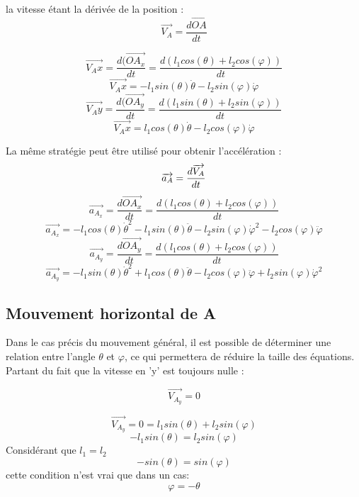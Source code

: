 \documentclass{udes_rapport} %
\begin{document}
la vitesse étant la dérivée de la position :
\begin{equation}
	\overrightarrow{V_A} = \frac{d\overrightarrow{OA}}{dt}
\end{equation}

\[ \overrightarrow{V_Ax} = \frac{d(\overrightarrow{OA_x}}{dt} = \frac{d(l_1 cos(\theta) + l_2 cos(\varphi))}{dt}	\]
\[ \overrightarrow{V_Ax} = -l_1 sin(\theta) \dot{\theta} -l_2 sin(\varphi) \dot{\varphi}								\]
\[ \overrightarrow{V_Ay} = \frac{d(\overrightarrow{OA_y}}{dt} = \frac{d(l_1 sin(\theta) + l_2 sin(\varphi))}{dt}	\]
\[ \overrightarrow{V_Ax} = l_1 cos(\theta) \dot{\theta} -l_2 cos(\varphi) \dot{\varphi}								\]


La même stratégie peut être utilisé pour obtenir l'accélération :
\begin{equation}
\overrightarrow{a_A} = \frac{d\overrightarrow{V_A}}{dt}	\\
\end{equation}
\[	\overrightarrow{a_{A_x}} = \frac{d\overrightarrow{OA_x}}{dt} = \frac{ d(l_1 cos(\theta) + l_2 cos(\varphi))}{dt}		\]
\[	\overrightarrow{a_{A_x}} = - l_1 cos(\theta)\dot{\theta}^2 - l_1 sin(\theta)\ddot{\theta} - l_2 sin(\varphi)\dot{\varphi}^2 - l_2 cos(\varphi)\ddot{\varphi}  \]
\[	\overrightarrow{a_{A_y}} = \frac{d\overrightarrow{OA_y}}{dt} = \frac{d(l_1 cos(\theta) + l_2 cos(\varphi))}{dt}		\]
\[	\overrightarrow{a_{A_y}} =  - l_1 sin(\theta)\dot{\theta}^2 + l_1 cos(\theta)\ddot{\theta} -l_2 cos(\varphi)\ddot{\varphi} + l_2 sin(\varphi)\dot{\varphi}^2 \]

\subsection{Mouvement horizontal de A}
Dans le cas précis du mouvement général, il est possible de déterminer une relation entre l'angle $\theta$ et $\varphi$, ce qui permettera de réduire la taille des équations. Partant du fait que la vitesse en 'y' est toujours nulle : 

\begin{equation}
\overrightarrow{V_{A_y}} = 0
\end{equation}

\[	\overrightarrow{V_{A_y}} = 0 = l_1 sin(\theta) + l_2 sin(\varphi)		\]
\[	-l_1 sin(\theta) = l_2 sin(\varphi)	\]
Considérant que $l_1 = l_2$
\[	-sin(\theta) = sin(\varphi) 		\]
cette condition n'est vrai que dans un cas:
\begin{equation}
\varphi = -\theta		
\label{eq:rel}
\end{equation}
\end{document}
